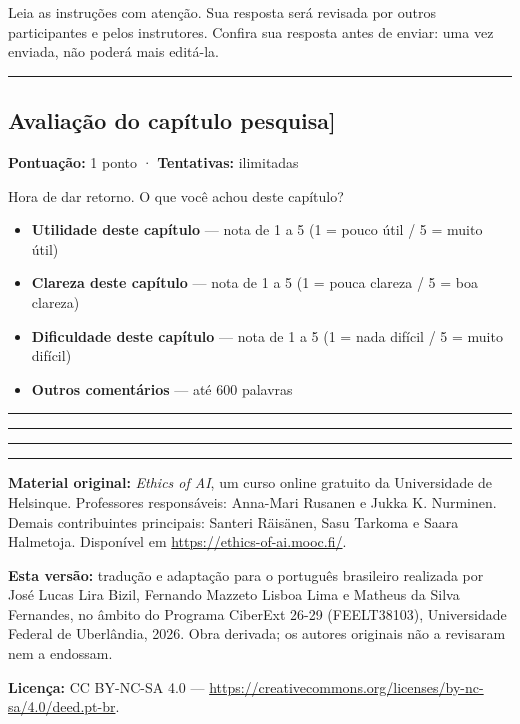 \documentclass[
  11pt,
]{article}
\providecommand{\tightlist}{%
  \setlength{\itemsep}{0pt}\setlength{\parskip}{0pt}}
\newcommand{\faixaEixos}[1][\linewidth]{%
  \noindent
  \textcolor{iaConceitos}{\rule{0.3333#1}{4pt}}%
  \textcolor{iaAplic}{\rule{0.3333#1}{4pt}}%
  \textcolor{iaRiscos}{\rule{0.3333#1}{4pt}}%
  \par}
\renewcommand{\texttt}[1]{{\color{iaAmeixa}\small\ttfamily #1}}
\newenvironment{licenca}
  {\par\vspace{2em}\faixaEixos\par\vspace{0.8em}
   \begingroup\sffamily\scriptsize\color{iaTintaFraca}}
  {\endgroup\par}
\begin{document}
Leia as instruções com atenção. Sua resposta será revisada por outros
participantes e pelos instrutores. Confira sua resposta antes de enviar:
uma vez enviada, não poderá mais editá-la.

\begin{center}\rule{0.5\linewidth}{0.5pt}\end{center}

\hypertarget{avaliauxe7uxe3o-do-capuxedtulo-pesquisa}{%
\subsection{\texorpdfstring{Avaliação do capítulo
\texttt{{[}pesquisa{]}}}{Avaliação do capítulo {[}pesquisa{]}}}\label{avaliauxe7uxe3o-do-capuxedtulo-pesquisa}}

\textbf{Pontuação:} 1 ponto · \textbf{Tentativas:} ilimitadas

Hora de dar retorno. O que você achou deste capítulo?

\begin{itemize}
\tightlist
\item
  \textbf{Utilidade deste capítulo} --- nota de 1 a 5 (1 = pouco útil /
  5 = muito útil)
\item
  \textbf{Clareza deste capítulo} --- nota de 1 a 5 (1 = pouca clareza /
  5 = boa clareza)
\item
  \textbf{Dificuldade deste capítulo} --- nota de 1 a 5 (1 = nada
  difícil / 5 = muito difícil)
\item
  \textbf{Outros comentários} --- até 600 palavras
\end{itemize}

\begin{center}\rule{0.5\linewidth}{0.5pt}\end{center}

\begin{licenca}

\textbf{Material original:} \emph{Ethics of AI}, um curso online
gratuito da Universidade de Helsinque. Professores responsáveis:
Anna-Mari Rusanen e Jukka K. Nurminen. Demais contribuintes principais:
Santeri Räisänen, Sasu Tarkoma e Saara Halmetoja. Disponível em
\url{https://ethics-of-ai.mooc.fi/}.

\textbf{Esta versão:} tradução e adaptação para o português brasileiro
realizada por José Lucas Lira Bizil, Fernando Mazzeto Lisboa Lima e
Matheus da Silva Fernandes, no âmbito do Programa CiberExt 26-29
(FEELT38103), Universidade Federal de Uberlândia, 2026. Obra derivada;
os autores originais não a revisaram nem a endossam.

\textbf{Licença:} CC BY-NC-SA 4.0 ---
\url{https://creativecommons.org/licenses/by-nc-sa/4.0/deed.pt-br}.

\end{licenca}
\end{document}
